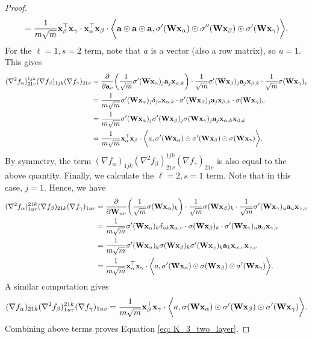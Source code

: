 \begin{proof}
\[		= \frac{1}{m\sqrt{m}}{\mathbf{x}}_\beta^\top{\mathbf{x}}_\gamma \cdot {\mathbf{x}}_\alpha^\top{\mathbf{x}}_\beta \cdot \bigg\langle {\mathbf{a}} \odot  {\mathbf{a}}\odot {\mathbf{a}}  , \sigma'({\mathbf{W}} {\mathbf{x}}_\alpha)\odot \sigma''({\mathbf{W}} {\mathbf{x}}_\beta) \odot \sigma'({\mathbf{W}} {\mathbf{x}}_\gamma) \bigg\rangle.
	\]
	For the $\ell=1, s = 2$ term, note that $a$ is a vector (also a row matrix), so $u = 1$. This gives 
	\begin{align*}
		(\nabla^2 f_\alpha)^{1jk}_{21v} (\nabla f_\beta)_{1jk} (\nabla f_\gamma)_{21 v} & = \frac{\partial}{\partial {\mathbf{a}}_v}\bigg(\frac{1}{\sqrt{m}} \sigma'({\mathbf{W}} {\mathbf{x}}_\alpha)_j {\mathbf{a}}_j{\mathbf{x}}_{\alpha, k}\bigg) \cdot \frac{1}{\sqrt{m}} \sigma'({\mathbf{W}} {\mathbf{x}}_\beta)_j {\mathbf{a}}_j{\mathbf{x}}_{\beta, k}  \cdot \frac{1}{\sqrt{m}} \sigma({\mathbf{W}} {\mathbf{x}}_\gamma)_v \\
		& = \frac{1}{m\sqrt{m}} \sigma'({\mathbf{W}} {\mathbf{x}}_\alpha)_j \delta_{jv}{\mathbf{x}}_{\alpha, k} \cdot \sigma'({\mathbf{W}} {\mathbf{x}}_\beta)_j {\mathbf{a}}_j{\mathbf{x}}_{\beta, k} \cdot \sigma({\mathbf{W}} {\mathbf{x}}_\gamma)_v \\
		& = \frac{1}{m\sqrt{m}} \sigma'({\mathbf{W}} {\mathbf{x}}_\alpha)_j \sigma'({\mathbf{W}} {\mathbf{x}}_\beta)_j \sigma({\mathbf{W}} {\mathbf{x}}_\gamma)_j {\mathbf{a}}_j{\mathbf{x}}_{\alpha, k}{\mathbf{x}}_{\beta, k} \\
		& = \frac{1}{m\sqrt{m}} {\mathbf{x}}_\alpha^\top{\mathbf{x}}_\beta \cdot \bigg\langle a, \sigma'({\mathbf{W}} {\mathbf{x}}_\alpha)\odot \sigma'({\mathbf{W}} {\mathbf{x}}_\beta)\odot \sigma({\mathbf{W}} {\mathbf{x}}_\gamma)\bigg\rangle.
	\end{align*}
	By symmetry, the term $(\nabla f_\alpha)_{1jk} (\nabla^2 f_\beta)^{1jk}_{21v} (\nabla f_\gamma)_{21 v}$ is also equal to the above quantity. Finally, we calculate the $\ell = 2, s= 1$ term. Note that in this case, $j = 1$. Hence, we have
	\begin{align*}
		(\nabla^2 f_\alpha)^{21 k }_{1uv} (\nabla f_\beta)_{21 k} (\nabla f_\gamma)_{1uv}	& = \frac{\partial}{\partial {\mathbf{W}}_{uv}}\bigg( \frac{1}{\sqrt{m}} \sigma({\mathbf{W}} {\mathbf{x}}_\alpha)_k\bigg)  \cdot \frac{1}{\sqrt{m}} \sigma({\mathbf{W}} {\mathbf{x}}_\beta)_k  \cdot \frac{1}{\sqrt{m}} \sigma'({\mathbf{W}} {\mathbf{x}}_\gamma)_u {\mathbf{a}}_u{\mathbf{x}}_{\gamma, v}\\
		& = \frac{1}{m\sqrt{m}} \sigma'({\mathbf{W}} {\mathbf{x}}_\alpha)_k \delta_{uk}{\mathbf{x}}_{\alpha, v}  \cdot \sigma({\mathbf{W}} {\mathbf{x}}_\beta)_k \cdot \sigma'({\mathbf{W}} {\mathbf{x}}_\gamma)_u {\mathbf{a}}_u{\mathbf{x}}_{\gamma, v} \\
		& = \frac{1}{m\sqrt{m}} \sigma'({\mathbf{W}} {\mathbf{x}}_\alpha)_k \sigma({\mathbf{W}} {\mathbf{x}}_\beta)_k \sigma'({\mathbf{W}} {\mathbf{x}}_\gamma)_k {\mathbf{a}}_k{\mathbf{x}}_{\alpha, v}{\mathbf{x}}_{\gamma, v} \\
		& = \frac{1}{m\sqrt{m}}{\mathbf{x}}_\alpha^\top{\mathbf{x}}_\gamma \cdot \bigg\langle a, \sigma'({\mathbf{W}} {\mathbf{x}}_\alpha)\odot \sigma({\mathbf{W}} {\mathbf{x}}_\beta)\odot \sigma'({\mathbf{W}} {\mathbf{x}}_\gamma) \bigg\rangle.
	\end{align*}
	A similar computation gives
	\[
		(\nabla f_\alpha)_{21 k } (\nabla^2 f_\beta)^{21 k}_{1uv} (\nabla f_\gamma)_{1uv}= \frac{1}{m\sqrt{m}}{\mathbf{x}}_\beta^\top{\mathbf{x}}_\gamma \cdot \bigg\langle a, \sigma({\mathbf{W}} {\mathbf{x}}_\alpha)\odot \sigma'({\mathbf{W}} {\mathbf{x}}_\beta)\odot \sigma'({\mathbf{W}} {\mathbf{x}}_\gamma) \bigg\rangle.	
	\]
	Combining above terms proves Equation \eqref{eq: K_3_two_layer}.


\end{proof}
